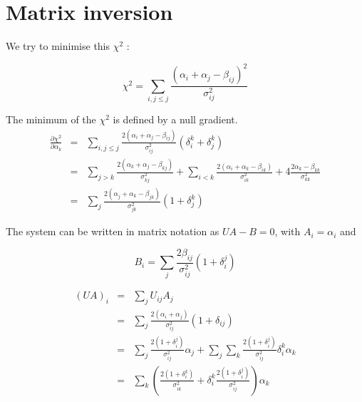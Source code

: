 \label{sec:org11b2f25}
\chapter{Matrix inversion}
\label{sec:org1c930a8}
\label{sec:MatrixInversion}


We try to minimise this \(\chi^{\text{2}}\) :

\begin{equation}
\chi^2 = \sum_{i,j\leq j}\frac{(\alpha_i+\alpha_j-\beta_{ij})^2}{\sigma^2_{ij}}
\end{equation}

The minimum of the \(\chi^{\text{2}}\) is defined by a null gradient.
\begin{equation}
\begin{array}{lcl}
\frac{\partial \chi^2}{\partial \alpha_k} &=& \sum\limits_{i,j\leq j}\frac{2(\alpha_i+\alpha_j-\beta_{ij})}{\sigma^2_{ij}} (\delta_i^k + \delta_j^k) \\
&=& \sum\limits_{j>k} \frac{2(\alpha_k+\alpha_j-\beta_{kj})}{\sigma^2_{kj}} + \sum\limits_{i<k} \frac{2(\alpha_i+\alpha_k-\beta_{ik})}{\sigma^2_{ik}} + 4\frac{2\alpha_k-\beta_{kk}}{\sigma_{kk}^2} \\
&=& \sum\limits_j \frac{2(\alpha_j+\alpha_k-\beta_{jk})}{\sigma^2_{jk}} (1+\delta_j^k)
\end{array}
\end{equation}

The system can be written in matrix notation as \(UA-B=0\), with \(A_i=\alpha_i\) and

\begin{equation}
B_i = \sum\limits_j \frac{2\beta_{ij}}{\sigma^2_{ij}} (1+\delta_i^j)
\end{equation}

\begin{equation}
\begin{array}{lcl}
(UA)_i &=&\sum\limits_j U_{ij}A_j \\
&=& \sum\limits_j \frac{2(\alpha_i+\alpha_j)}{\sigma_{ij}^2} (1+\delta_{ij}) \\
&=& \sum\limits_j \frac{2(1+\delta_i^j)}{\sigma_{ij}^2}\alpha_j + \sum\limits_j \sum\limits_k \frac{2(1+\delta_i^j)}{\sigma_{ij}^2} \delta_i^k\alpha_k \\
&=& \sum\limits_k \left( \frac{2(1+\delta_i^k)}{\sigma_{ik}^2} +  \delta_i^k \frac{2(1+\delta_i^j)}{\sigma_{ij}^2}  \right) \alpha_k
\end{array}
\end{equation}



